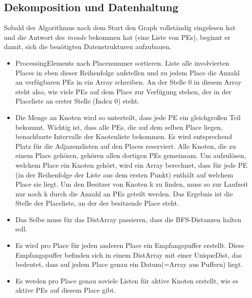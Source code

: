 \subsection{Dekomposition und Datenhaltung} %
\label{sub:dekomposition_und_datenhaltung}

Sobald der Algorithmus nach dem Start den Graph vollständig eingelesen hat und die Antwort des \textit{invade} bekommen hat (eine Liste von PEs), beginnt er damit, sich die benötigten Datenstrukturen aufzubauen.
\begin{itemize}
	\item ProcessingElements nach Placenummer sortieren. Liste alle involvierten Places in eben dieser Reihenfolge aufstellen und zu jedem Place die Anzahl an verfügbaren PEs in ein Array schreiben. An der Stelle 0 in diesem Array steht also, wie viele PEs auf dem Place zur Verfügung stehen, der in der Placeliste an erster Stelle (Index 0) steht.
	\item Die Menge an Knoten wird so unterteilt, dass jede PE ein gleichgroßen Teil bekommt. Wichtig ist, dass alle PEs, die auf dem selben Place liegen, benachbarte Intervalle der Knotenliste bekommen. Es wird entsprechend Platz für die Adjazenzlisten auf den Places reserviert. Alle Knoten, die zu einem Place gehören, gehören allen dortigen PEs gemeinsam. Um aufzulösen, welchem Place ein Knoten gehört, wird ein Array berechnet, dass für jede PE (in der Reihenfolge der Liste aus dem ersten Punkt) enthält auf welchem Place sie liegt. Um den Besitzer von Knoten k zu finden, muss so zur Laufzeit nur noch k durch die Anzahl an PEs geteilt werden. Das Ergebnis ist die Stelle der Placeliste, an der der besitzende Place steht.
	\item Das Selbe muss für das DistArray passieren, dass die BFS-Distanzen halten soll.
	\item Es wird pro Place für jeden anderen Place ein Empfangspuffer erstellt. Diese Empfangspuffer befinden sich in einem DistArray mit einer UniqueDist, das bedeutet, dass auf jedem Place genau ein Datum(=Array aus Puffern) liegt.
	\item Es werden pro Place genau soviele Listen für aktive Knoten erstellt, wie es aktive PEs auf diesem Place gibt.
\end{itemize}


